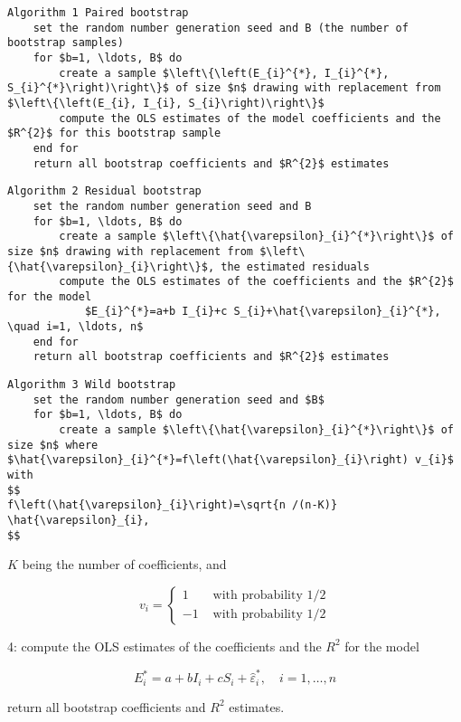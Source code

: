 \begin{lstlisting}
Algorithm 1 Paired bootstrap
    set the random number generation seed and B (the number of bootstrap samples)
    for $b=1, \ldots, B$ do
        create a sample $\left\{\left(E_{i}^{*}, I_{i}^{*}, S_{i}^{*}\right)\right\}$ of size $n$ drawing with replacement from $\left\{\left(E_{i}, I_{i}, S_{i}\right)\right\}$
        compute the OLS estimates of the model coefficients and the $R^{2}$ for this bootstrap sample
    end for
    return all bootstrap coefficients and $R^{2}$ estimates
\end{lstlisting}

\begin{lstlisting}
Algorithm 2 Residual bootstrap
    set the random number generation seed and B
    for $b=1, \ldots, B$ do
        create a sample $\left\{\hat{\varepsilon}_{i}^{*}\right\}$ of size $n$ drawing with replacement from $\left\{\hat{\varepsilon}_{i}\right\}$, the estimated residuals
        compute the OLS estimates of the coefficients and the $R^{2}$ for the model
            $E_{i}^{*}=a+b I_{i}+c S_{i}+\hat{\varepsilon}_{i}^{*}, \quad i=1, \ldots, n$
    end for
    return all bootstrap coefficients and $R^{2}$ estimates
\end{lstlisting}

\begin{lstlisting}
Algorithm 3 Wild bootstrap
    set the random number generation seed and $B$
    for $b=1, \ldots, B$ do
        create a sample $\left\{\hat{\varepsilon}_{i}^{*}\right\}$ of size $n$ where $\hat{\varepsilon}_{i}^{*}=f\left(\hat{\varepsilon}_{i}\right) v_{i}$ with
$$
f\left(\hat{\varepsilon}_{i}\right)=\sqrt{n /(n-K)} \hat{\varepsilon}_{i},
$$
\end{lstlisting}

$K$ being the number of coefficients, and

$$
v_{i}= \begin{cases}1 & \text { with probability } 1 / 2 \\ -1 & \text { with probability } 1 / 2\end{cases}
$$

4: compute the OLS estimates of the coefficients and the $R^{2}$ for the model

$$
E_{i}^{*}=a+b I_{i}+c S_{i}+\hat{\varepsilon}_{i}^{*}, \quad i=1, \ldots, n
$$

return all bootstrap coefficients and $R^{2}$ estimates.